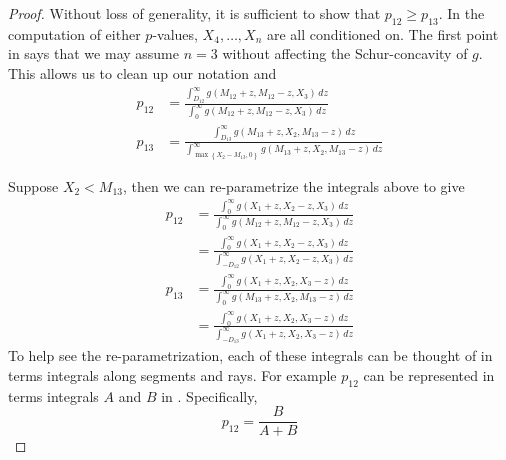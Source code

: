 \documentclass[11pt]{article}
\begin{document}
\begin{proof}
Without loss of generality, it is sufficient to show that $p_{12} \ge p_{13}$. In the computation of either $p$-values, $X_4, \ldots, X_n$ are all conditioned on. The first point in  says that we may assume $n = 3$ without affecting the Schur-concavity of $g$. This allows us to clean up our notation and
\begin{align*}
p_{12} & = \frac{\int_{D_{12}}^\infty g\left(M_{12} + z, M_{12} - z, X_3\right) \,dz}{\int_0^\infty g\left(M_{12} + z, M_{12} - z, X_3\right) \,dz} \\
p_{13} & = \frac{\int_{D_{13}}^\infty g\left(M_{13} + z, X_2, M_{13} - z\right) \,dz}{\int_{\max\left\{X_2 - M_{13}, 0\right\}}^\infty g\left(M_{13} + z, X_2, M_{13} - z\right) \,dz}
\end{align*}

Suppose $X_2 < M_{13}$, then we can re-parametrize the integrals above to give
\begin{align*}
p_{12} & = \frac{\int_0^\infty g\left(X_1 + z, X_2 - z, X_3\right) \,dz}{\int_0^\infty g\left(M_{12} + z, M_{12} - z, X_3\right) \,dz} \\
& = \frac{\int_0^\infty g\left(X_1 + z, X_2 - z, X_3\right) \,dz}{\int_{-D_{12}}^\infty g\left(X_1 + z, X_2 - z, X_3\right) \,dz} \\
p_{13} & = \frac{\int_0^\infty g\left(X_1 + z, X_2, X_3 - z\right) \,dz}{\int_0^\infty g\left(M_{13} + z, X_2, M_{13} - z\right) \,dz} \\
& = \frac{\int_0^\infty g\left(X_1 + z, X_2, X_3 - z\right) \,dz}{\int_{-D_{13}}^\infty g\left(X_1 + z, X_2, X_3 - z\right) \,dz}
\end{align*}
To help see the re-parametrization, each of these integrals can be thought of in terms integrals along segments and rays. For example $p_{12}$ can be represented in terms integrals $A$ and $B$ in . Specifically,
$$p_{12} = \frac{B}{A + B}$$


\end{proof}
\end{document}
